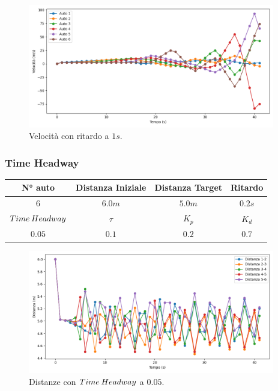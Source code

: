 \begin{figure}[H]
    \includegraphics[width=0.96\textwidth]{images/5-experiment/delay/velocity_1.png}
    \caption{Velocità con ritardo a $1 s$.}
    \label{fig:1-delay-velocity}
\end{figure}
\vspace*{\fill}
\newpage


\subsubsection{Time Headway}
\vspace*{\fill}
\begin{table}[h]
    \centering
    \begin{tabular}{|c|c|c|c|}
        \hline
        N° auto & Distanza Iniziale & Distanza Target & Ritardo \\
        \hline
        $6$ & $6.0 m$ & $5.0 m$ & $0.2 s$ \\
        \hline
        $Time\hspace{0.2em}Headway$ & $\tau$ & $K_p$ & $K_d$  \\
        \hline
        $0.05$ & $0.1$ & $0.2$ & $0.7$ \\
        \hline
    \end{tabular}
\end{table}

\begin{figure}[H]
    \includegraphics[width=0.96\textwidth]{images/5-experiment/time-headway/distance_0,05.png}
    \caption{Distanze con $Time\hspace{0.2em}Headway$ a $0.05$.}
    \label{fig:0.05-headway-distance}
\end{figure}

